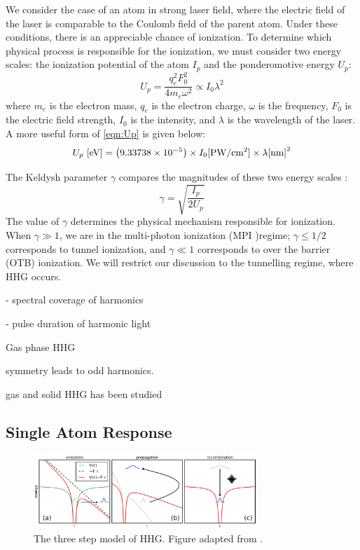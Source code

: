 We consider the case of an atom in strong laser field, where the electric field of the laser is comparable to the Coulomb field of the parent atom. Under these conditions, there is an appreciable chance of ionization. To determine which physical process is responsible for the ionization, we must consider two energy scales: the ionization potential of the atom $I_p$ and the ponderomotive energy $U_p$:
\begin{equation}
U_p = \frac{q_e^2 F_0^2}{4 m_e \omega^2} \propto I_0 \lambda^2
\label{eqn:Up}
\end{equation}
where $m_e$ is the electron mass, $q_e$ is the electron charge, $\omega$ is the frequency, $F_0$ is the electric field strength, $I_0$ is the intensity, and $\lambda$ is the wavelength of the laser. A more useful form of \cref{eqn:Up} is given below:
\begin{equation}
U_p \textrm{ [eV]} = \left( 9.33738 \times 10^{-5} \right) \times I_0 \textrm{[PW/cm\textsuperscript{2}]} \times \lambda\textrm{[nm]}^2
\label{eqn:Up-numbers}
\end{equation}

The Keldysh parameter $\gamma$ compares the magnitudes of these two energy scales \cite{keldyshIonizationFieldStrong1965}:
\begin{equation}
\gamma = \sqrt{\frac{I_p}{2 U_p}}
\end{equation}
The value of $\gamma$ determines the physical mechanism responsible for ionization. When $\gamma \gg 1$, we are in the multi-photon ionization (MPI )regime; $\gamma \le 1/2$ corresponds to tunnel ionization, and $\gamma \ll 1$ corresponds to over the barrier (OTB) ionization. We will restrict our discussion to the tunnelling regime, where HHG occurs.

- spectral coverage of harmonics

- pulse duration of harmonic light

Gas phase HHG 

symmetry leads to odd harmonics.

gas and solid HHG has been studied

\subsection{Single Atom Response}

\label{sec:single-atom-response}

\begin{figure}
	\centering
	\includegraphics[width=0.75\textwidth]{figures/chap1/ThreeStepModel.png}
	\caption{The three step model of HHG. Figure adapted from \cite{schounAttosecondHighHarmonicSpectroscopy2015}.}
	\label{fig:ThreeStepModel}
\end{figure}

